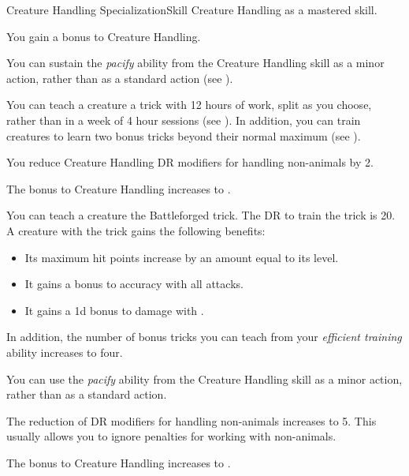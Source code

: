     \begin{feat}{Creature Handling Specialization}{Skill}
        \featpre Creature Handling as a mastered skill.
        \featben

         You gain a  bonus to Creature Handling.

         You can sustain the \textit{pacify} ability from the Creature Handling skill as a minor action, rather than as a standard action (see ).

         You can teach a creature a trick with 12 hours of work, split as you choose, rather than in a week of 4 hour sessions (see ).
        In addition, you can train creatures to learn two bonus tricks beyond their normal maximum (see ).

         You reduce Creature Handling DR modifiers for handling non-animals by 2.

         The bonus to Creature Handling increases to .

         You can teach a creature the Battleforged trick.
        The DR to train the trick is 20.
        A creature with the trick gains the following benefits:
        \begin{itemize}
            \item Its maximum hit points increase by an amount equal to its level.
            \item It gains a  bonus to accuracy with all attacks.
            \item It gains a \plus1d bonus to damage with .
        \end{itemize}
        In addition, the number of bonus tricks you can teach from your \textit{efficient training} ability increases to four.

         You can use the \textit{pacify} ability from the Creature Handling skill as a minor action, rather than as a standard action.

         The reduction of DR modifiers for handling non-animals increases to 5.
        This usually allows you to ignore penalties for working with non-animals.

         The bonus to Creature Handling increases to .


\end{feat}
